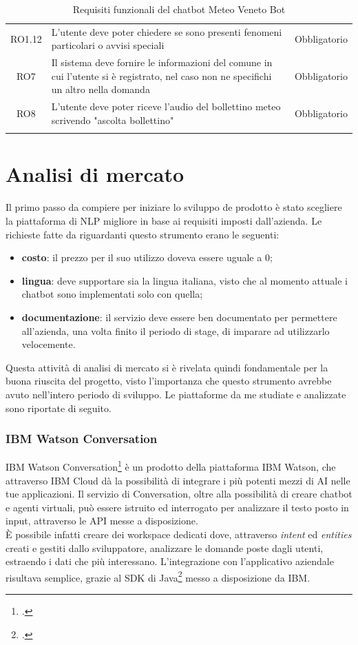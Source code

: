 \begin{longtable}{|c|>{\centering}m{7cm}|c|}
RO1.12 & L'utente deve poter chiedere se sono presenti fenomeni particolari o avvisi speciali & Obbligatorio\\ 
RO7 & Il sistema deve fornire le informazioni del comune in cui l'utente si è registrato, nel caso non ne specifichi un altro nella domanda & Obbligatorio\\
RO8 & L'utente deve poter riceve l'audio del bollettino meteo scrivendo "ascolta bollettino" & Obbligatorio\\ 
\hline
\caption{Requisiti funzionali del chatbot Meteo Veneto Bot}
\end{longtable}

\section{Analisi di mercato}
Il primo passo da compiere per iniziare lo sviluppo de prodotto è stato scegliere la piattaforma di \gls{NLP} migliore in base ai requisiti imposti dall'azienda. Le richieste fatte da \azienda{} riguardanti questo strumento erano le seguenti:
\begin{itemize}
	\item \textbf{costo}: il prezzo per il suo utilizzo doveva essere uguale a 0;
	\item \textbf{lingua}: deve supportare sia la lingua italiana, visto che al momento attuale i \gls{chatbot} sono implementati solo con quella;
	\item \textbf{documentazione}: il servizio deve essere ben documentato per permettere all'azienda, una volta finito il periodo di stage, di imparare ad utilizzarlo velocemente.
\end{itemize}

Questa attività di analisi di mercato si è rivelata quindi fondamentale per la buona riuscita del progetto, visto l'importanza che questo strumento avrebbe avuto nell'intero periodo di sviluppo. Le piattaforme da me studiate e analizzate sono riportate di seguito.

\subsubsection{IBM Watson Conversation}
IBM Watson Conversation\footcite{watson} è un prodotto della piattaforma IBM Watson, che attraverso IBM Cloud dà la possibilità di integrare i più potenti mezzi di \gls{AI} nelle tue applicazioni. Il servizio di Conversation, oltre alla possibilità di creare \gls{chatbot} e agenti virtuali, può essere istruito ed interrogato per analizzare il testo posto in input, attraverso le \gls{API} messe a disposizione.\\
È possibile infatti creare dei workspace dedicati dove, attraverso \emph{intent} ed \emph{entities} creati e gestiti dallo sviluppatore, analizzare le domande poste dagli utenti, estraendo i dati che più interessano. L'integrazione con l'applicativo aziendale risultava semplice, grazie al \gls{SDK} di Java\footcite{watsonSDK} messo a disposizione da IBM.

